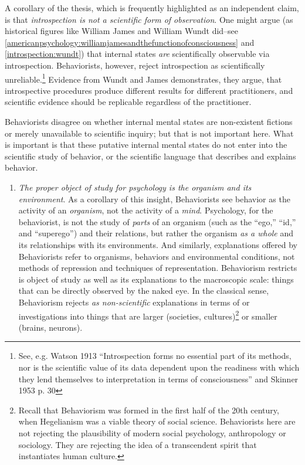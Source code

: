 A corollary of the thesis, which is frequently highlighted as an independent claim, is that \emph{introspection is not a scientific form of observation}. One might argue (as historical figures like William James and William Wundt did–see \ref{americanpsychology:williamjamesandthefunctionofconsciousness} and \ref{introspection:wundt}) that internal states \emph{are} scientifically observable via introspection. Behaviorists, however, reject introspection as scientifically unreliable.\footnote{See, e.g. Watson 1913 ``Introspection forms no essential part of its methods, nor is the scientific value of its data dependent upon the readiness with which they lend themselves to interpretation in terms of consciousness'' and Skinner 1953 p. 30} Evidence from Wundt and James demonstrates, they argue, that introspective procedures produce different results for different practitioners, and scientific evidence should be replicable regardless of the practitioner.

Behaviorists disagree on whether internal mental states are non-existent fictions or merely unavailable to scientific inquiry; but that is not important here. What is important is that these putative internal mental states do not enter into the scientific study of behavior, or the scientific language that describes and explains behavior.

\begin{enumerate}
\item \emph{The proper object of study for psychology is the organism and its environment}. As a corollary of this insight, Behaviorists see behavior as the activity of an \emph{organism}, not the activity of a \emph{mind}. Psychology, for the behaviorist, is not the study of \emph{parts} of an organism (such as the ``ego,'' ``id,'' and ``superego'') and their relations, but rather the organism \emph{as a whole} and its relationships with its environments. And similarly, explanations offered by Behaviorists refer to organisms, behaviors and environmental conditions, not methods of repression and techniques of representation. Behaviorism restricts is object of study as well as its explanations to the macroscopic scale: things that can be directly observed by the naked eye. In the classical sense, Behaviorism rejects \emph{as non-scientific} explanations in terms of or investigations into things that are larger (societies, cultures)\footnote{Recall that Behaviorism was formed in the first half of the 20th century, when Hegelianism was a viable theory of social science. Behaviorists here are not rejecting the plausibility of modern social psychology, anthropology or sociology. They are rejecting the idea of a transcendent spirit that instantiates human culture.} or smaller (brains, neurons).

\end{enumerate}

